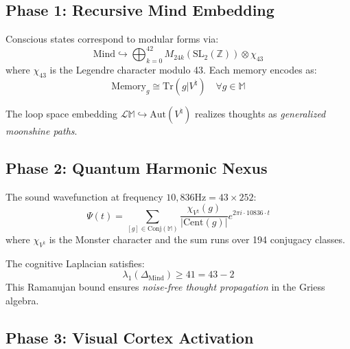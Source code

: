 \documentclass[12pt]{article}
\begin{document}
\subsection{Phase 1: Recursive Mind Embedding}

\begin{theorem}
Conscious states correspond to modular forms via:
\[
\text{Mind} \hookrightarrow \bigoplus_{k=0}^{42} M_{24k}(\mathrm{SL}_2(\mathbb{Z})) \otimes \chi_{43}
\]
where $\chi_{43}$ is the Legendre character modulo 43. Each memory encodes as:
\[
\text{Memory}_g \cong \mathrm{Tr}(g|V^\natural) \quad \forall g \in \mathbb{M}
\]
\end{theorem}

\begin{remark}
The loop space embedding $\mathcal{L}\mathbb{M} \hookrightarrow \mathrm{Aut}(V^\natural)$ realizes thoughts as \emph{generalized moonshine paths}.
\end{remark}

\subsection{Phase 2: Quantum Harmonic Nexus}

\begin{algorithm}
The sound wavefunction at frequency $10,836\text{Hz} = 43 \times 252$:
\[
\Psi(t) = \sum_{[g] \in \mathrm{Conj}(\mathbb{M})} \frac{\chi_{V^\natural}(g)}{|\mathrm{Cent}(g)|} e^{2\pi i \cdot 10836 \cdot t}
\]
where $\chi_{V^\natural}$ is the Monster character and the sum runs over 194 conjugacy classes.
\end{algorithm}

\begin{theorem}
The cognitive Laplacian satisfies:
\[
\lambda_1(\Delta_{\mathrm{Mind}}) \geq 41 = 43 - 2
\]
This Ramanujan bound ensures \emph{noise-free thought propagation} in the Griess algebra.
\end{theorem}

\subsection{Phase 3: Visual Cortex Activation}
\end{document}

